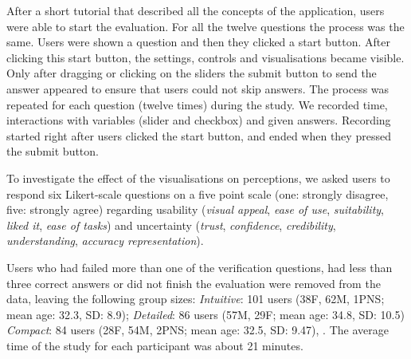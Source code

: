 \documentclass[final,5p,times,twocolumn,authoryear]{elsarticle}
\begin{document}
After a short tutorial that described all the concepts of the application, users were able to start the evaluation. For all the twelve questions the process was the same. Users were shown a question and then they clicked a start button. After clicking this start button, the settings, controls and visualisations became visible. Only after dragging or clicking on the sliders the submit button to send the answer appeared to ensure that users could not skip answers. The process was repeated for each question (twelve times) during the study. We recorded time, interactions with variables (slider and checkbox) and given answers. Recording started right after users clicked the start button, and ended when they pressed the submit button.

To investigate the effect of the visualisations on perceptions, we asked users to respond six Likert-scale questions on a five point scale (one: strongly disagree, five: strongly agree)  regarding usability (\emph{visual appeal}, \emph{ease of use}, \emph{suitability}, \emph{liked it}, \emph{ease of tasks}) and uncertainty (\emph{trust}, \emph{confidence}, \emph{credibility}, \emph{understanding}, \emph{accuracy representation}).

Users who had failed more than one of the verification questions, had less than three correct answers or did not finish the evaluation were removed from the data, leaving the following group sizes: \textit{Intuitive}: 101 users (38F, 62M, 1PNS; mean age: 32.3, SD: 8.9); \textit{Detailed}: 86 users (57M, 29F; mean age: 34.8, SD: 10.5) \textit{Compact}: 84 users (28F, 54M, 2PNS; mean age: 32.5, SD: 9.47), . The average time of the study for each participant was about 21 minutes. 
\end{document}
